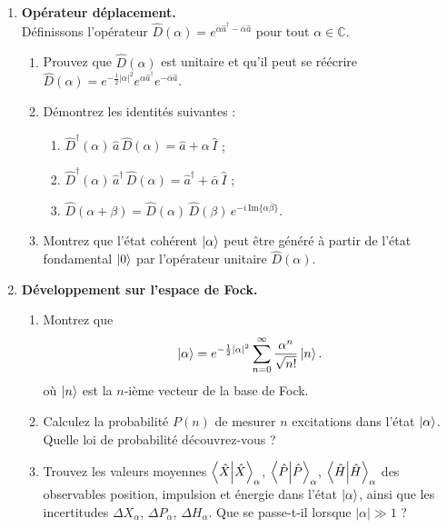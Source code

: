 \begin{enumerate}

\item \textbf{Opérateur déplacement.} \\
Définissons l'opérateur $\hat D(\alpha) = e^{\alpha \hat a^\dagger - \bar \alpha \hat a}$ pour tout $\alpha\in\mathbb{C}$.
\begin{enumerate}
\item Prouvez que $\hat D(\alpha)$ est unitaire et qu'il peut se réécrire $\hat D(\alpha) = e^{-\frac{1}{2}|\alpha|^2} e^{\alpha \hat a^\dagger} e^{-\bar \alpha \hat a}$. 
\item Démontrez les identités suivantes :
\begin{enumerate}
\item $\hat D^\dagger (\alpha) \, \hat a \, \hat D(\alpha) = \hat a + \alpha \,\hat I$ ;
\item $\hat D^\dagger (\alpha) \, \hat a^\dagger \, \hat D(\alpha) = \hat a^\dagger + \bar \alpha \, \hat I$ ;
\item $\hat D(\alpha+\beta) = \hat D(\alpha) \, \hat D(\beta) \, e^{-i \, \text{Im}\lbrace \alpha\bar\beta\rbrace}$.
\end{enumerate}
\item Montrez que l'état cohérent $\ket{\alpha}$ peut être généré à partir de l'état fondamental $\ket{0}$ par l'opérateur unitaire $\hat D(\alpha)$.
\end{enumerate}

\item \textbf{Développement sur l'espace de Fock.} 
\begin{enumerate}
\item Montrez que
\begin{equation}
\ket{\alpha} = e^{-\frac{1}{2}|\alpha|^2} \sum_{n=0}^\infty \frac{\alpha^n}{\sqrt{n!}} \ket{n}.
\end{equation}
où $\ket{n}$ est la $n$-ième vecteur de la base de Fock.
\item Calculez la probabilité $P(n)$ de mesurer $n$ excitations dans l'état $\ket{\alpha}$. Quelle loi de probabilité découvrez-vous ?
\item Trouvez les valeurs moyennes $\braket{\hat X}_\alpha$, $\braket{\hat P}_\alpha$, $\braket{\hat H}_\alpha$ des observables position, impulsion et énergie dans l'état $\ket{\alpha}$, ainsi que les incertitudes $\Delta X_\alpha$, $\Delta P_\alpha$, $\Delta H_\alpha$. Que se passe-t-il lorsque $|\alpha|\gg 1$ ?
\end{enumerate}


\end{enumerate}
